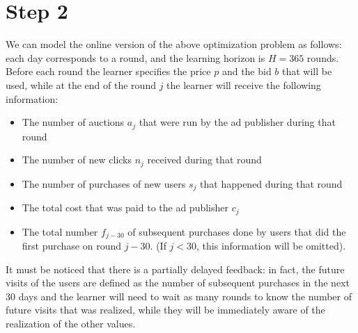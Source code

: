 \documentclass[11pt]{article} %
\begin{document}
\section{Step 2}
We can model the online version of the above optimization problem as follows: each day corresponds to a round, and the learning horizon is $H=365$ rounds. Before each round the learner specifies the price $p$ and the bid $b$ that will be used, while at the end of the round $j$ the learner will receive the following information:
\begin{itemize}
\item The number of auctions $a_j$ that were run by the ad publisher during that round
\item The number of new clicks  $n_j$ received during that round
\item The number of purchases of new users $s_j$ that happened during that round 
\item The total cost that was paid to the ad publisher $c_j$
\item The total number $f_{j-30}$ of subsequent purchases done by users that did the first purchase on round $j-30$. (If $j < 30$, this information will be omitted).
\end{itemize}
It must be noticed that there is a partially delayed feedback: in fact, the future visits of the users are defined as the number of subsequent purchases in the next 30 days and the learner will need to wait as many rounds to know the number of future visits that was realized, while they will be immediately aware of the realization of the other values.\\
\end{document}
